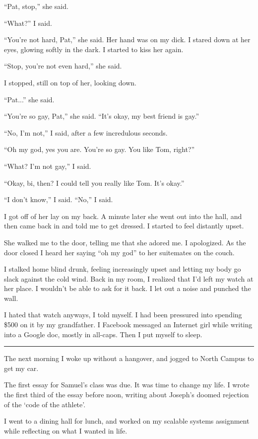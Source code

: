 ``Pat, stop,'' she said.

``What?'' I said.

``You're not hard, Pat,'' she said.  Her hand was on my dick.  I stared down at
her eyes, glowing softly in the dark.  I started to kiss her again.

``Stop, you're not even hard,'' she said.

I stopped, still on top of her, looking down.

``Pat...'' she said.

``You're so gay, Pat,'' she said.  ``It's okay, my best friend is gay.''

``No, I'm not,'' I said, after a few incredulous seconds.

``Oh my god, yes you are.  You're so gay.  You like Tom, right?''

``What?  I'm not gay,'' I said.

``Okay, bi, then?  I could tell you really like Tom.  It's okay.''

``I don't know,'' I said.  ``No,'' I said.

I got off of her lay on my back.  A minute later she went out into the hall, and
then came back in and told me to get dressed.  I started to feel distantly
upset.

She walked me to the door, telling me that she adored me.  I apologized.  As the
door closed I heard her saying ``oh my god'' to her suitemates on the couch.

I stalked home blind drunk, feeling increasingly upset and letting my body go
slack against the cold wind.  Back in my room, I realized that I'd left my watch
at her place.  I wouldn't be able to ask for it back.  I let out a noise and
punched the wall. 

I hated that watch anyways, I told myself. I had been pressured into spending
\$500 on it by my grandfather.  I Facebook messaged an Internet girl while
writing into a Google doc, mostly in all-caps.  Then I put myself to sleep.

\plainfancybreak{12pt}{2}{* * *}

The next morning I woke up without a hangover, and jogged to North Campus to get
my car.  

The first essay for Samuel's class was due.  It was time to change my life.  I
wrote the first third of the essay before noon, writing about Joseph's doomed
rejection of the `code of the athlete'.

I went to a dining hall for lunch, and worked on my scalable systems assignment
while reflecting on what I wanted in life.

